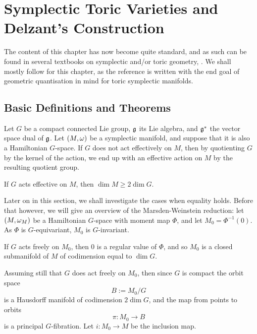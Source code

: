 
\chapter{Symplectic Toric Varieties and Delzant's Construction}
 
The content of this chapter has now become quite standard, and as such can be found in several textbooks on symplectic and/or toric geometry, \eg \cite{Aud04,Gui94,Sil01}. We shall mostly follow \cite{Gui94} for this chapter, as the reference is written with the end goal of geometric quantisation in mind for toric symplectic manifolds.
 
\section{Basic Definitions and Theorems}

Let $G$ be a compact connected Lie group, $\mathfrak{g}$ its Lie algebra, and $\mathfrak{g}^{\ast}$
the vector space dual of $\mathfrak{g}$.  Let $(M,\omega)$ be a symplectic manifold, and suppose that it is also a Hamiltonian $G$-space. If $G$ does not act effectively on $M$, then by quotienting $G$ by the kernel of the action, we end up with an effective action on $M$ by the resulting quotient group.

\begin{thm}
	If $G$ acts effective on $M$, then $\dim M \geq 2 \dim G$.
\end{thm}

Later on in this section, we shall investigate the cases when equality holds. Before that however, we will give an overview of the Marsden-Weinstein reduction: let $(M,\omega_{M})$ be a Hamiltonian $G$-space with moment map $\Phi$, and let $M_{0} = \Phi^{-1}(0)$. As $\Phi$ is $G$-equivariant, $M_{0}$ is $G$-invariant.

\begin{thm}
	If $G$ acts freely on $M_{0}$, then $0$ is a regular value of $\Phi$, and so $M_{0}$ is a closed submanifold of $M$ of codimension equal to $\dim G$.
\end{thm}

Assuming still that $G$ does act freely on $M_{0}$, then since $G$ is compact the orbit space
\begin{equation*}
	B := M_{0}/G
\end{equation*}
is a Hausdorff manifold of codimension $2\dim G$, and the map from points to orbits
\begin{equation*}
	\pi: M_{0} \longrightarrow B
\end{equation*}
is a principal $G$-fibration. Let $i: M_{0} \rightarrow M$ be the inclusion map.

